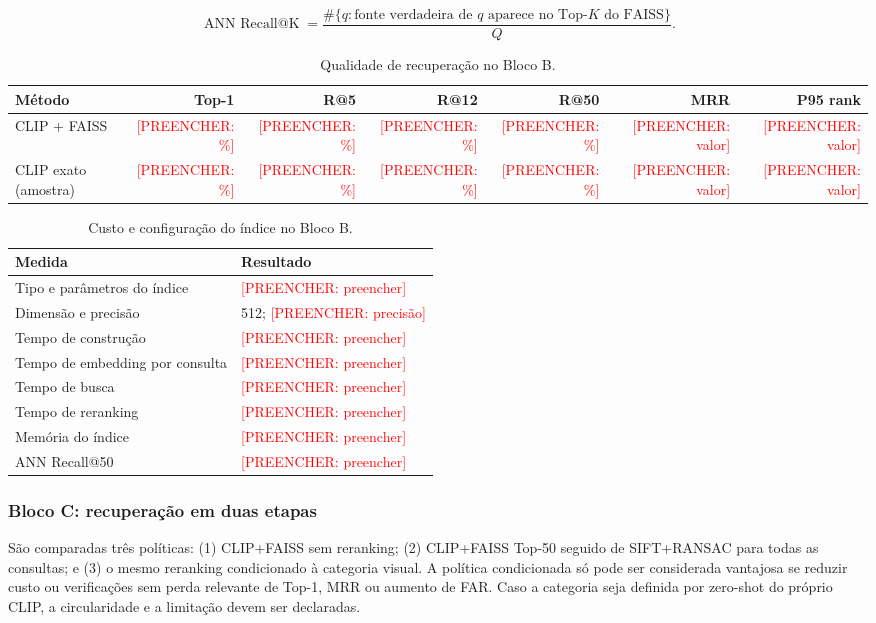 \documentclass[12pt]{article}
\newcommand{\todo}[1]{\textcolor{red}{[PREENCHER: #1]}}
\newcommand{\clip}{CLIP}
\newcommand{\faiss}{FAISS}
\begin{document}
\begin{equation}
\operatorname{ANN\ Recall@K}=
\frac{\#\{q:\text{fonte verdadeira de }q\text{ aparece no Top-}K
\text{ do FAISS}\}}{Q}.
\label{eq:ann-recall}
\end{equation}

\begin{table}[H]
\centering
\caption{Qualidade de recuperação no Bloco B.}
\label{tab:qualidade-b}
\begin{tabularx}{\linewidth}{Y r r r r r r}
\toprule
\textbf{Método} & \textbf{Top-1} & \textbf{R@5} & \textbf{R@12} &
\textbf{R@50} & \textbf{MRR} & \textbf{P95 rank}\\
\midrule
CLIP + FAISS & \todo{\%} & \todo{\%} & \todo{\%} & \todo{\%} &
\todo{valor} & \todo{valor}\\
CLIP exato (amostra) & \todo{\%} & \todo{\%} & \todo{\%} & \todo{\%} &
\todo{valor} & \todo{valor}\\
\bottomrule
\end{tabularx}
\end{table}

\begin{table}[H]
\centering
\caption{Custo e configuração do índice no Bloco B.}
\label{tab:custo-b}
\begin{tabularx}{\linewidth}{Y Y}
\toprule
\textbf{Medida} & \textbf{Resultado}\\
\midrule
Tipo e parâmetros do índice & \todo{preencher}\\
Dimensão e precisão & 512; \todo{precisão}\\
Tempo de construção & \todo{preencher}\\
Tempo de embedding por consulta & \todo{preencher}\\
Tempo de busca & \todo{preencher}\\
Tempo de reranking & \todo{preencher}\\
Memória do índice & \todo{preencher}\\
ANN Recall@50 & \todo{preencher}\\
\bottomrule
\end{tabularx}
\end{table}

\subsubsection{Bloco C: recuperação em duas etapas}

São comparadas três políticas: (1) \clip{}+\faiss{} sem reranking; (2)
\clip{}+\faiss{} Top-50 seguido de SIFT+RANSAC para todas as consultas; e
(3) o mesmo reranking condicionado à categoria visual. A política
condicionada só pode ser considerada vantajosa se reduzir custo ou verificações
sem perda relevante de Top-1, MRR ou aumento de FAR. Caso a categoria seja
definida por zero-shot do próprio CLIP, a circularidade e a limitação devem
ser declaradas.
\end{document}
